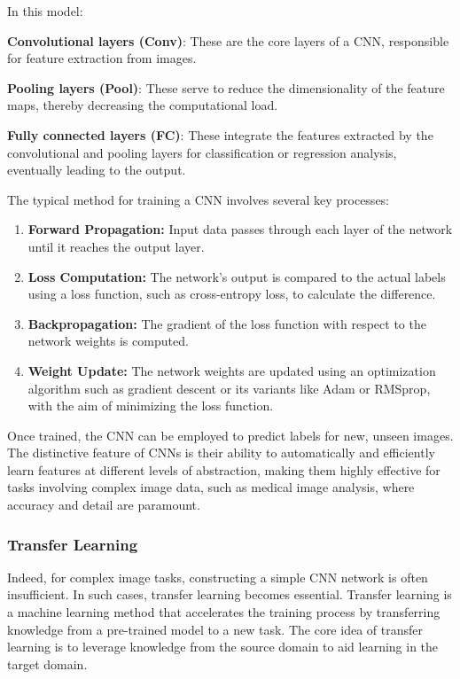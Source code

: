 In this model:

\textbf{Convolutional layers (Conv)}: These are the core layers of a CNN, responsible for feature extraction from images.

\textbf{Pooling layers (Pool)}: These serve to reduce the dimensionality of the feature maps, thereby decreasing the computational load.

\textbf{Fully connected layers (FC)}: These integrate the features extracted by the convolutional and pooling layers for classification or regression analysis, eventually leading to the output.

The typical method for training a CNN involves several key processes:\cite{4.30 2}

\begin{enumerate}
    \item \textbf{Forward Propagation:} Input data passes through each layer of the network until it reaches the output layer.
    \item \textbf{Loss Computation:} The network's output is compared to the actual labels using a loss function, such as cross-entropy loss, to calculate the difference.
    \item \textbf{Backpropagation:} The gradient of the loss function with respect to the network weights is computed.
    \item \textbf{Weight Update:} The network weights are updated using an optimization algorithm such as gradient descent or its variants like Adam or RMSprop, with the aim of minimizing the loss function.
\end{enumerate}

Once trained, the CNN can be employed to predict labels for new, unseen images. The distinctive feature of CNNs is their ability to automatically and efficiently learn features at different levels of abstraction, making them highly effective for tasks involving complex image data, such as medical image analysis, where accuracy and detail are paramount.\cite{4.30 3}

\subsubsection{Transfer Learning}

Indeed, for complex image tasks, constructing a simple CNN network is often insufficient. In such cases, transfer learning becomes essential. Transfer learning is a machine learning method that accelerates the training process by transferring knowledge from a pre-trained model to a new task. The core idea of transfer learning is to leverage knowledge from the source domain to aid learning in the target domain.\cite{4.30 4}

